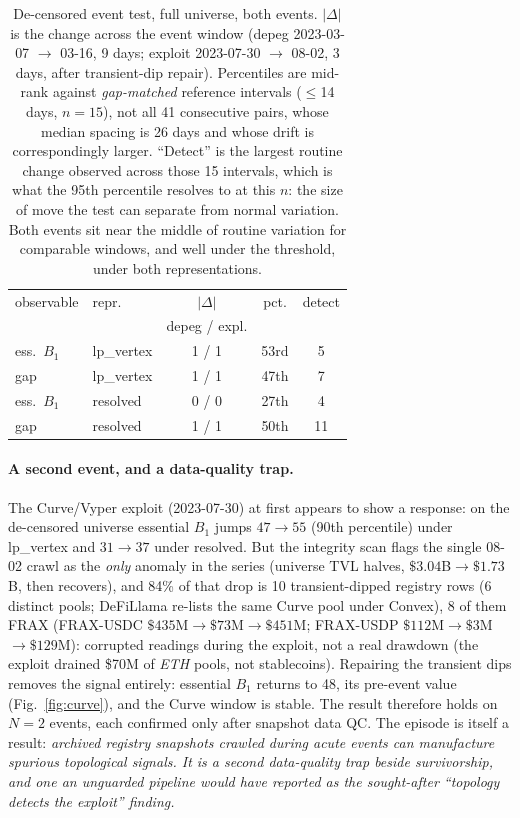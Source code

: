 \documentclass[10pt,twocolumn]{article}
\begin{document}
\begin{table}[t]
\centering
\caption{De-censored event test, full universe, both events. $|\Delta|$ is the change
across the event window (depeg 2023-03-07 $\to$ 03-16, 9 days; exploit 2023-07-30 $\to$
08-02, 3 days, after transient-dip repair). Percentiles are mid-rank against
\emph{gap-matched} reference intervals ($\le$14 days, $n=15$), not all 41 consecutive
pairs, whose median spacing is 26 days and whose drift is correspondingly larger.
``Detect'' is the largest routine change observed across those 15 intervals, which is what
the 95th percentile resolves to at this $n$: the size of move the test can separate from
normal variation. Both events sit near the middle of
routine variation for comparable windows, and well under the threshold, under both
representations.}
\label{tab:null}
\small
\setlength{\tabcolsep}{4.5pt}
\begin{tabular}{llccc}
\toprule
observable & repr. & \multicolumn{1}{c}{$|\Delta|$} & pct. & detect \\
 & & \multicolumn{1}{c}{\scriptsize depeg / expl.} & & \\
\midrule
ess.\ $B_1$ & lp\_vertex & 1 / 1 & 53rd & 5 \\
gap         & lp\_vertex & 1 / 1 & 47th & 7 \\
ess.\ $B_1$ & resolved   & 0 / 0 & 27th & 4 \\
gap         & resolved   & 1 / 1 & 50th & 11 \\
\bottomrule
\end{tabular}
\end{table}

\paragraph{A second event, and a data-quality trap.} The Curve/Vyper exploit (2023-07-30)
at first appears to show a response: on the de-censored universe essential $B_1$ jumps
$47\to55$ (90th percentile) under lp\_vertex and $31\to37$ under resolved. But the integrity
scan flags the single 08-02 crawl as the \emph{only} anomaly in the series (universe TVL
halves, $\$3.04$B$\to\$1.73$B, then recovers), and 84\% of that drop is 10
transient-dipped registry rows (6 distinct pools; DeFiLlama re-lists the same Curve pool
under Convex), 8 of them FRAX (FRAX-USDC $\$435$M$\to\$73$M$\to\$451$M; FRAX-USDP
$\$112$M$\to\$3$M$\to\$129$M): corrupted readings during the exploit, not a real drawdown
(the exploit drained \$70M of \emph{ETH} pools, not stablecoins). Repairing the transient
dips removes the signal entirely: essential $B_1$ returns to 48, its pre-event value
(Fig.~\ref{fig:curve}), and the Curve window is stable. The result therefore holds on
\textbf{$N=2$} events, each confirmed only after snapshot data QC. The episode is itself a
result: \emph{archived registry snapshots crawled during acute events can manufacture
spurious topological signals. It is a second data-quality trap beside survivorship, and
one an unguarded pipeline would have reported as the sought-after ``topology detects the
exploit'' finding.}
\end{document}
